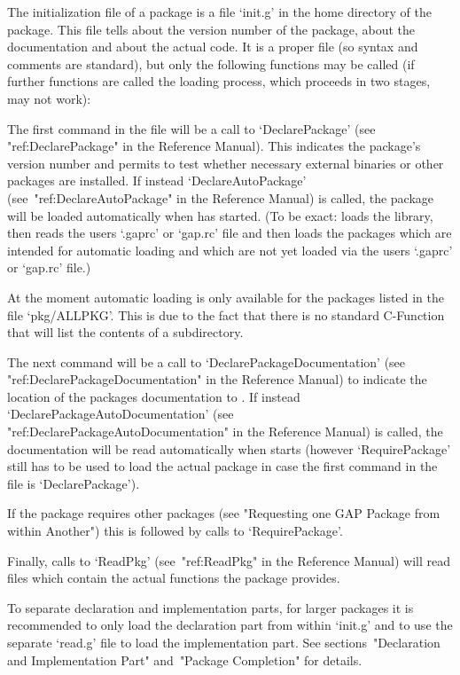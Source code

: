 
The initialization file of a {\GAP} package is a file `init.g' in the
home directory of the package. This file tells {\GAP} about the
version number of the {\GAP} package, about the documentation and about
the actual code. It is a proper {\GAP} file (so syntax and comments
are standard), but only the following {\GAP} functions may be called
(if further functions are called the loading process, which proceeds
in two stages, may not work):

The first command in the file will be a call to `DeclarePackage' (see
"ref:DeclarePackage" in the Reference Manual). This indicates the package's
version number and permits to test whether necessary external binaries or
other {\GAP} packages are installed. If instead `DeclareAutoPackage'
(see~"ref:DeclareAutoPackage" in the Reference Manual) is called, the
package will be loaded automatically when {\GAP} has started. (To be exact:
{\GAP} loads the library, then reads the users `.gaprc' or `gap.rc' file
and then loads the {\GAP} packages which are intended for automatic loading
and which are not yet loaded via the users `.gaprc' or `gap.rc' file.)

At the moment automatic loading is only available for the packages listed
in the file `pkg/ALLPKG'. This is due to the fact that there is no standard
C-Function that will list the contents of a subdirectory.

The next command will be a call to `DeclarePackageDocumentation' (see
"ref:DeclarePackageDocumentation" in the Reference Manual) to indicate the
location of the packages documentation to {\GAP}. If instead
`DeclarePackageAutoDocumentation' (see "ref:DeclarePackageAutoDocumentation"
in the Reference Manual) is called, the documentation will be read
automatically when {\GAP} starts (however `RequirePackage' still has to be
used to load the actual package in case the first command in the file is
`DeclarePackage').

If the package requires other {\GAP} packages (see "Requesting one GAP
Package from within Another") this is followed by calls to `RequirePackage'.

Finally, calls to `ReadPkg' (see~"ref:ReadPkg" in the Reference Manual)
will read files which contain the actual {\GAP}
functions the package provides.

To separate declaration and implementation parts, for larger packages it is
recommended to only load the declaration part from within `init.g' and to
use the separate `read.g' file to load the implementation part.
See sections~"Declaration and Implementation Part" and~"Package Completion"
for details.

